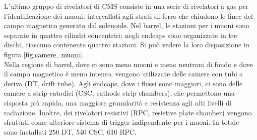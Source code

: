 \noindent L'ultimo gruppo di rivelatori di CMS consiste in una serie di rivelatori a gas per l'identificazione dei muoni, intervallati agli strati di ferro che chiudono le linee del campo magnetico generato dal solenoide. Nel barrel, le stazioni per i muoni sono separate in quattro cilindri concentrici; negli endcaps sono organizzate in tre dischi, ciascuno contenente quattro stazioni. Si pu\`o vedere la loro disposizione in figura \ref{fig:camere_muoni}.\\
Nella regione di barrel, dove ci sono meno muoni e meno neutroni di fondo e dove il campo magnetico \`e meno intenso, vengono utilizzate delle camere con tubi a deriva (DT, drift tube). Agli endcaps, dove i flussi sono maggiori, ci sono delle camere a strip catodici (CSC, cathode strip chambers), che permettono una risposta pi\`u rapida, una maggiore granularit\`a e resistenza agli alti livelli di radiazione. Inoltre, dei rivelatori resistivi (RPC, resistive plate chamber) vengono sfruttati come ulteriore sistema di trigger indipendente per i muoni. In totale sono installati 250 DT, 540 CSC, 610 RPC.

\begin{figure}%
\centering
\label{fig:DT}
\end{figure}

